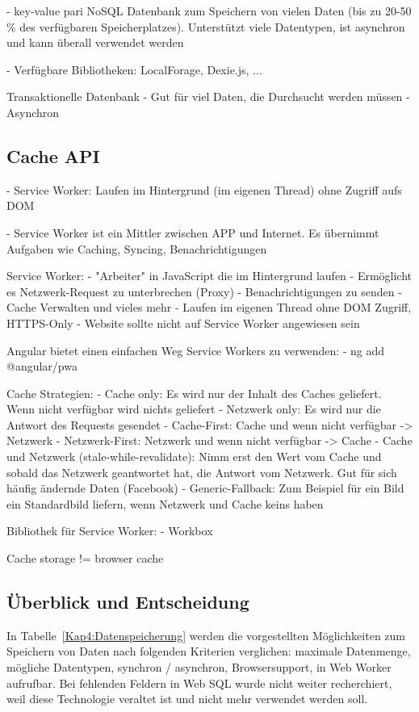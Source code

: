 - key-value pari NoSQL Datenbank zum Speichern von vielen Daten (bis zu 20-50 \% des verfügbaren Speicherplatzes). Unterstützt viele Datentypen, ist asynchron und kann überall verwendet werden \autocite{Hajian2019}

- Verfügbare Bibliotheken: LocalForage, Dexie.js, ... \autocite{Hajian2019}

Transaktionelle Datenbank
- Gut für viel Daten, die Durchsucht werden müssen
- Asynchron

\subsection{Cache API}
- Service Worker: Laufen im Hintergrund (im eigenen Thread) ohne Zugriff aufs DOM \autocite{Sheppard2017}

- Service Worker ist ein Mittler zwischen APP und Internet. Es übernimmt Aufgaben wie Caching, Syncing, Benachrichtigungen \autocite{Sheppard2017}

Service Worker:
- "Arbeiter" in JavaScript die im Hintergrund laufen
- Ermöglicht es Netzwerk-Request zu unterbrechen (Proxy)
- Benachrichtigungen zu senden
- Cache Verwalten und vieles mehr
- Laufen im eigenen Thread ohne DOM Zugriff, HTTPS-Only
- Website sollte nicht auf Service Worker angewiesen sein
\autocite{Hajian2019}

Angular bietet einen einfachen Weg Service Workers zu verwenden:
- ng add @angular/pwa
\autocite{Hajian2019}

Cache Strategien:
- Cache only: Es wird nur der Inhalt des Caches geliefert. Wenn nicht verfügbar wird nichts geliefert
- Netzwerk only: Es wird nur die Antwort des Requests gesendet
- Cache-First: Cache und wenn nicht verfügbar -> Netzwerk
- Netzwerk-First: Netzwerk und wenn nicht verfügbar -> Cache
- Cache und Netzwerk (stale-while-revalidate): Nimm erst den Wert vom Cache und sobald das Netzwerk geantwortet hat, die Antwort vom Netzwerk. Gut für sich häufig ändernde Daten (Facebook)
- Generic-Fallback: Zum Beispiel für ein Bild ein Standardbild liefern, wenn Netzwerk und Cache keins haben
\autocite{Hajian2019} \autocite{Rojas2020}

Bibliothek für Service Worker:
- Workbox
\autocite{Rojas2020}

Cache storage != browser cache \autocite{Rojas2020}

\subsection{Überblick und Entscheidung}
In Tabelle~\ref{Kap4:Datenspeicherung} werden die vorgestellten Möglichkeiten zum Speichern von Daten nach folgenden Kriterien verglichen: maximale Datenmenge, mögliche Datentypen, synchron / asynchron, Browsersupport, in Web Worker aufrufbar. Bei fehlenden Feldern in Web SQL wurde nicht weiter recherchiert, weil diese Technologie veraltet ist und nicht mehr verwendet werden soll.

